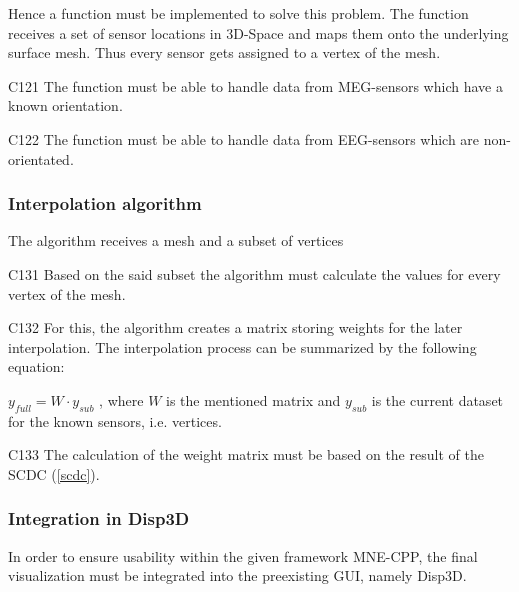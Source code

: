 	Hence a function must be implemented to solve this problem. 
	The function receives a set of sensor locations in 3D-Space and maps them onto the underlying surface mesh. Thus every 			sensor gets assigned to a vertex of the mesh. 

	\begin{aims}
	
		\item[C121] The function must be able to handle data from MEG-sensors which have a known orientation.
		\item[C122] The function must be able to handle data from EEG-sensors which are non-orientated.
	
	\end{aims}

\subsubsection{Interpolation algorithm} 

	The algorithm receives a mesh and a subset of vertices %
	
	\begin{aims}
	
		\item[C131] Based on the said subset the algorithm must calculate the values for every vertex of the mesh.
		\item[C132] For this, the algorithm creates a matrix storing weights for the later interpolation.
					The interpolation process can be summarized by the following equation: 
					
					$y_{full} = W \cdot y_{sub}$
					, where $W$ is the mentioned matrix and $y_{sub}$ is the current dataset for the known sensors, i.e. 							vertices.
		\item[C133] The calculation of the weight matrix must be based on the result of the SCDC (\ref{scdc}).
	
	
	
	\end{aims}

\subsubsection{Integration in Disp3D}
	In order to ensure usability within the given framework MNE-CPP, the final visualization must be integrated into the 			preexisting GUI, namely Disp3D.
	
